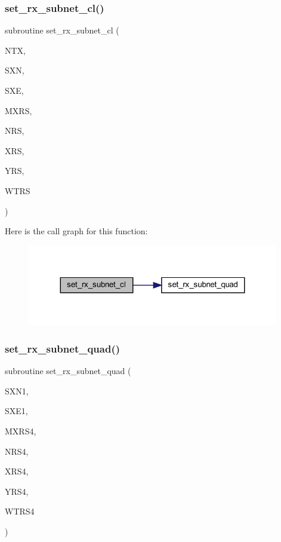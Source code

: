 \subsubsection{\texorpdfstring{set\+\_\+rx\+\_\+subnet\+\_\+cl()}{set\_rx\_subnet\_cl()}}
{\footnotesize\ttfamily subroutine set\+\_\+rx\+\_\+subnet\+\_\+cl (\begin{DoxyParamCaption}\item[{integer}]{N\+TX,  }\item[{real, dimension (4,ntx)}]{S\+XN,  }\item[{real, dimension (4,ntx)}]{S\+XE,  }\item[{integer}]{M\+X\+RS,  }\item[{integer, dimension(1,ntx)}]{N\+RS,  }\item[{real, dimension (mxrs,1,ntx)}]{X\+RS,  }\item[{real, dimension (mxrs,1,ntx)}]{Y\+RS,  }\item[{real, dimension (mxrs,1,ntx)}]{W\+T\+RS }\end{DoxyParamCaption})}

Here is the call graph for this function\+:\nopagebreak
\begin{figure}[H]
\begin{center}
\leavevmode
\includegraphics[width=311pt]{Leroi__c_8f90_a805e33739aa8ba4bfe42148473309ce0_cgraph}
\end{center}
\end{figure}
\mbox{\label{Leroi__c_8f90_a397597f84bff232d8a1a2f4a44e6e75f}} 
\subsubsection{\texorpdfstring{set\+\_\+rx\+\_\+subnet\+\_\+quad()}{set\_rx\_subnet\_quad()}}
{\footnotesize\ttfamily subroutine set\+\_\+rx\+\_\+subnet\+\_\+quad (\begin{DoxyParamCaption}\item[{real, dimension(4)}]{S\+X\+N1,  }\item[{real, dimension(4)}]{S\+X\+E1,  }\item[{integer}]{M\+X\+R\+S4,  }\item[{integer}]{N\+R\+S4,  }\item[{real, dimension(mxrs4)}]{X\+R\+S4,  }\item[{real, dimension(mxrs4)}]{Y\+R\+S4,  }\item[{real}]{W\+T\+R\+S4 }\end{DoxyParamCaption})}

